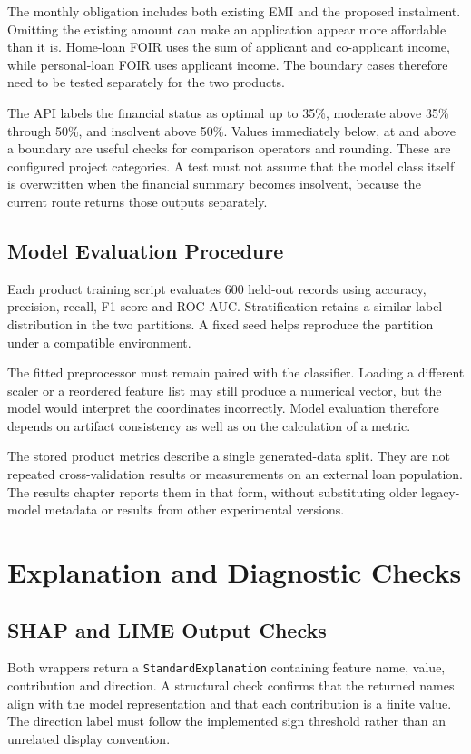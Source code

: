 The monthly obligation includes both existing EMI and the proposed instalment. Omitting the existing amount can make an application appear more affordable than it is. Home-loan FOIR uses the sum of applicant and co-applicant income, while personal-loan FOIR uses applicant income. The boundary cases therefore need to be tested separately for the two products.

The API labels the financial status as optimal up to 35\%, moderate above 35\% through 50\%, and insolvent above 50\%. Values immediately below, at and above a boundary are useful checks for comparison operators and rounding. These are configured project categories. A test must not assume that the model class itself is overwritten when the financial summary becomes insolvent, because the current route returns those outputs separately.

\subsection{Model Evaluation Procedure}
Each product training script evaluates 600 held-out records using accuracy, precision, recall, F1-score and ROC-AUC. Stratification retains a similar label distribution in the two partitions. A fixed seed helps reproduce the partition under a compatible environment.

The fitted preprocessor must remain paired with the classifier. Loading a different scaler or a reordered feature list may still produce a numerical vector, but the model would interpret the coordinates incorrectly. Model evaluation therefore depends on artifact consistency as well as on the calculation of a metric.

The stored product metrics describe a single generated-data split. They are not repeated cross-validation results or measurements on an external loan population. The results chapter reports them in that form, without substituting older legacy-model metadata or results from other experimental versions.

\section{Explanation and Diagnostic Checks}
\subsection{SHAP and LIME Output Checks}
Both wrappers return a \texttt{StandardExplanation} containing feature name, value, contribution and direction. A structural check confirms that the returned names align with the model representation and that each contribution is a finite value. The direction label must follow the implemented sign threshold rather than an unrelated display convention.

